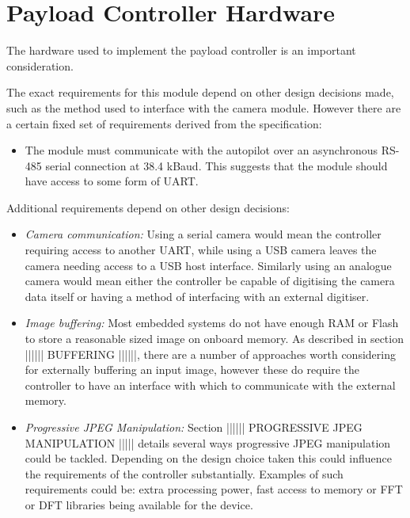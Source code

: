 \section{Payload Controller Hardware}
The hardware used to implement the payload controller is an important consideration.

The exact requirements for this module depend on other design decisions made, such as the method used to interface with the camera module. However there are a certain fixed set of requirements derived from the specification:

\begin{itemize}
\item The module must communicate with the autopilot over an asynchronous RS-485 serial connection at 38.4 kBaud. This suggests that the module should have access to some form of UART.
\end{itemize}

Additional requirements depend on other design decisions:

\begin{itemize}
\item \emph{Camera communication:} Using a serial camera would mean the controller requiring access to another UART, while using a USB camera leaves the camera needing access to a USB host interface. Similarly using an analogue camera would mean either the controller be capable of digitising the camera data itself or having a method of interfacing with an external digitiser.
 
\item \emph{Image buffering:} Most embedded systems do not have enough RAM or Flash to store a reasonable sized image on onboard memory. As described in section |||||| BUFFERING ||||||, there are a number of approaches worth considering for externally buffering an input image, however these do require the controller to have an interface with which to communicate with the external memory. 

\item \emph{Progressive JPEG Manipulation:} Section |||||| PROGRESSIVE JPEG MANIPULATION ||||| details several ways progressive JPEG manipulation could be tackled. Depending on the design choice taken this could influence the requirements of the controller substantially. Examples of such requirements could be: extra processing power, fast access to memory or FFT or DFT libraries being available for the device.
\end{itemize}

